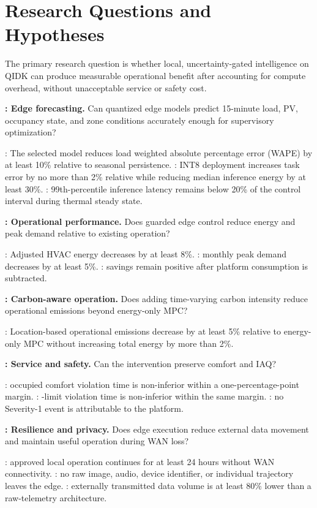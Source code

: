 \section{Research Questions and Hypotheses}

The primary research question is whether local, uncertainty-gated intelligence on QIDK can produce measurable operational benefit after accounting for compute overhead, without unacceptable service or safety cost.

\textbf{: Edge forecasting.} Can quantized edge models predict 15-minute load, PV, occupancy state, and zone conditions accurately enough for supervisory optimization?

: The selected model reduces load weighted absolute percentage error (WAPE) by at least 10\% relative to seasonal persistence. : INT8 deployment increases task error by no more than 2\% relative while reducing median inference energy by at least 30\%. : 99th-percentile inference latency remains below 20\% of the control interval during thermal steady state.

\textbf{: Operational performance.} Does guarded edge control reduce energy and peak demand relative to existing operation?

: Adjusted HVAC energy decreases by at least 8\%. : monthly peak demand decreases by at least 5\%. : savings remain positive after platform consumption is subtracted.

\textbf{: Carbon-aware operation.} Does adding time-varying carbon intensity reduce operational emissions beyond energy-only MPC?

: Location-based operational emissions decrease by at least 5\% relative to energy-only MPC without increasing total energy by more than 2\%.

\textbf{: Service and safety.} Can the intervention preserve comfort and IAQ?

: occupied comfort violation time is non-inferior within a one-percentage-point margin. : \COtwo{}-limit violation time is non-inferior within the same margin. : no Severity-1 event is attributable to the platform.

\textbf{: Resilience and privacy.} Does edge execution reduce external data movement and maintain useful operation during WAN loss?

: approved local operation continues for at least 24 hours without WAN connectivity. : no raw image, audio, device identifier, or individual trajectory leaves the edge. : externally transmitted data volume is at least 80\% lower than a raw-telemetry architecture.

